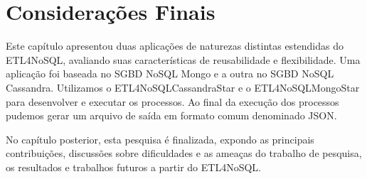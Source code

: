 \section{Considerações Finais}

Este capítulo apresentou duas aplicações de naturezas distintas estendidas do ETL4NoSQL, avaliando suas características de reusabilidade e flexibilidade. Uma aplicação foi baseada no SGBD NoSQL Mongo e a outra no SGBD NoSQL Cassandra. Utilizamos o ETL4NoSQLCassandraStar e o ETL4NoSQLMongoStar para desenvolver e executar os processos. Ao final da execução dos processos pudemos gerar um arquivo de saída em formato comum denominado JSON. 

No capítulo posterior, esta pesquisa é finalizada, expondo as principais contribuições, discussões sobre dificuldades e as ameaças do trabalho de pesquisa, os resultados e trabalhos futuros a partir do ETL4NoSQL.
